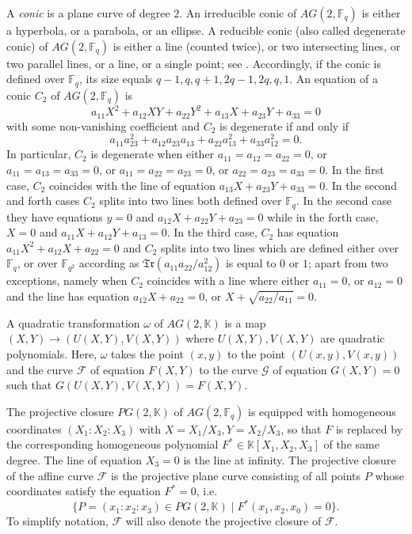 \documentclass[sn-mathphys-num]{sn-jnl}%
\begin{document}
A \emph{conic} is a plane curve of degree $2$. An irreducible conic of $AG(2,\mathbb{F}_q)$ is either a hyperbola, or a parabola, or an ellipse. A reducible conic (also called degenerate conic) of  $AG(2,\mathbb{F}_q)$ is either a line (counted twice), or two intersecting lines, or two parallel lines, or a line, or a single point; see \cite[Section 7.2]{HJWP}.  Accordingly, if the conic is defined over $\mathbb{F}_q$, its size equals $q-1,q,q+1,2q-1,2q,q,1$. An equation of a conic $C_2$ of $AG(2,\mathbb{F}_q)$ is
\begin{equation}
\label{eq21072025}
a_{11}X^2+a_{12}XY+a_{22}Y^2+a_{13}X+a_{23}Y+a_{33}=0
\end{equation}
with some non-vanishing coefficient and $C_2$ is degenerate if and only if
\begin{equation}
\label{conde}
a_{11}a_{23}^2+a_{12}a_{23}a_{13}+a_{22}a_{13}^2+a_{33}a_{12}^2=0.
\end{equation}
In particular, $C_2$ is degenerate when either $a_{11}=a_{12}=a_{22}=0$, or $a_{11}=a_{13}=a_{33}=0$, or $a_{11}=a_{22}=a_{23}=0$, or $a_{22}=a_{23}=a_{33}=0$. In the first case, $C_2$ coincides with the line of equation $a_{13}X+a_{23}Y+a_{33}=0$.
In  the second and forth cases $C_2$ splits into two lines both defined over $\mathbb{F}_q$. In the second case they have equations $y=0$ and $a_{12}X+a_{22}Y+a_{23}=0$ while in the forth case,  $X=0$ and $a_{11}X+a_{12}Y+a_{13}=0$. In the third case, $C_2$ has equation $a_{11}X^2+a_{12}X+a_{22}=0$ and $C_2$ splits into two lines which are defined either over $\mathbb{F}_q$, or over $\mathbb{F}_{q^2}$ according as $\mathfrak{Tr}(a_{11}a_{22}/a_{12}^2)$ is equal to $0$ or $1$;  apart from two exceptions, namely when $C_2$ coincides with a line where either  $a_{11}=0$, or $a_{12}=0$ and the line has equation $a_{12}X+a_{22}=0$, or $X+\sqrt{a_{22}/a_{11}}=0$.


A quadratic transformation $\omega$ of $AG(2,\mathbb{K})$ is a map $(X,Y)\rightarrow (U(X,Y),V(X,Y))$ where $U(X,Y),V(X,Y)$ are quadratic polynomials. Here, $\omega$ takes the point $(x,y)$ to the point $(U(x,y),V(x,y))$ and the curve $\mathcal{F}$ of equation $F(X,Y)$ to the curve $\mathcal{G}$ of equation $G(X,Y)=0$ such that  $G(U(X,Y),V(X,Y))=F(X,Y)$.

The projective closure $PG(2, \mathbb{K})$ of $AG(2,\mathbb{F}_q)$ is equipped with homogeneous coordinates $(X_1:X_2:X_3)$ with $X=X_1/X_3,Y=X_2/X_3$, so that $F$ is replaced by the corresponding homogeneous polynomial $F^*\in \mathbb{K}[X_1,X_2,X_3]$ of the same degree. The line of equation $X_3=0$ is the line at infinity.
The projective closure of the affine curve $\mathcal{F}$ is the projective plane curve consisting of all points $P$ whose coordinates satisfy the equation $F^*=0$, i.e.
\[\{P=(x_1:x_2:x_3) \in PG(2,\mathbb{K})\mid F^*(x_1,x_2,x_0)= 0\}.\]
To simplify notation, $\mathcal{F}$ will also denote the projective closure of $\mathcal{F}$.
\end{document}
